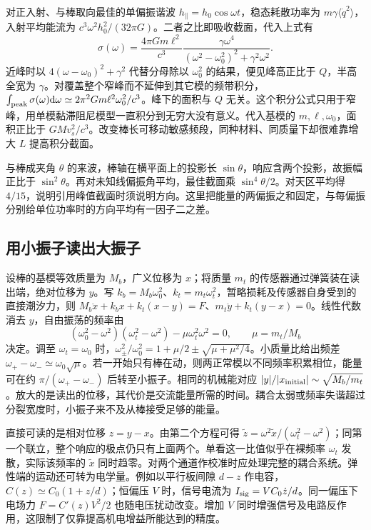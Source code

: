 对正入射、与棒取向最佳的单偏振谐波 $h_\parallel=h_0\cos\omega t$，稳态耗散功率为 $m\gamma\langle\dot q^2\rangle$，入射平均能流为 $c^3\omega^2 h_0^2/(32\pi G)$。二者之比即吸收截面，代入上式有
\[
 \sigma(\omega)=\frac{4\pi Gm\ell^2}{c^3}
 \frac{\gamma\omega^4}{(\omega^2-\omega_0^2)^2+\gamma^2\omega^2}.
\]
近峰时以 $4(\omega-\omega_0)^2+\gamma^2$ 代替分母除以 $\omega_0^2$ 的结果，便见峰高正比于 $Q$，半高全宽为 $\gamma$。对覆盖整个窄峰而不延伸到其它模的频带积分，$\int_{\rm peak}\sigma(\omega)\dd\omega\simeq2\pi^2Gm\ell^2\omega_0^2/c^3$。峰下的面积与 $Q$ 无关。这个积分公式只用于窄峰，用单模黏滞阻尼模型一直积分到无穷大没有意义。代入基模的 $m,\ell,\omega_0$，面积正比于 $GMv_s^2/c^3$。改变棒长可移动敏感频段，同种材料、同质量下却很难靠增大 $L$ 提高积分截面。

与棒成夹角 $\theta$ 的来波，棒轴在横平面上的投影长 $\sin\theta$，响应含两个投影，故振幅正比于 $\sin^2\theta$。再对未知线偏振角平均，最佳截面乘 $\sin^4\theta/2$。对天区平均得 $4/15$，说明引用峰值截面时须说明方向。这里把能量的两偏振之和固定，与每偏振分别给单位功率时的方向平均有一因子二之差。

\subsection{用小振子读出大振子}
设棒的基模等效质量为 $M_b$，广义位移为 $x$；将质量 $m_t$ 的传感器通过弹簧装在读出端，绝对位移为 $y$。写 $k_b=M_b\omega_0^2$、$k_t=m_t\omega_t^2$，暂略损耗及传感器自身受到的直接潮汐力，则 $M_b\ddot x+k_b x+k_t(x-y)=F$、$m_t\ddot y+k_t(y-x)=0$。线性代数消去 $y$，自由振荡的频率由
\[
 (\omega_0^2-\omega^2)(\omega_t^2-\omega^2)
       -\mu\omega_t^2\omega^2=0,\qquad \mu=m_t/M_b
\]
决定。调至 $\omega_t=\omega_0$ 时，$\omega_\pm^2/\omega_0^2=1+\mu/2\pm\sqrt{\mu+\mu^2/4}$。小质量比给出频差 $\omega_+-\omega_-\simeq\omega_0\sqrt\mu$。若一开始只有棒在动，则两正常模以不同频率积累相位，能量可在约 $\pi/(\omega_+-\omega_-)$ 后转至小振子。相同的机械能对应 $|y|/|x_{\rm initial}|\sim\sqrt{M_b/m_t}$。放大的是读出的位移，其代价是交流能量所需的时间。耦合太弱或频率失谐超过分裂宽度时，小振子来不及从棒接受足够的能量。

直接可读的是相对位移 $z=y-x$。由第二个方程可得 $\tilde z=\omega^2\tilde x/(\omega_t^2-\omega^2)$；同第一个联立，整个响应的极点仍只有上面两个。单看这一比值似乎在裸频率 $\omega_t$ 发散，实际该频率的 $\tilde x$ 同时趋零。对两个通道作校准时应处理完整的耦合系统。弹性端的运动还可转为电学量。例如以平行板间隙 $d-z$ 作电容，$C(z)\simeq C_0(1+z/d)$；恒偏压 $V$ 时，信号电流为 $I_{\rm sig}=VC_0\dot z/d$。同一偏压下电场力 $F=C'(z)V^2/2$ 也随电压扰动改变。增加 $V$ 同时增强信号及电路反作用，这限制了仅靠提高机电增益所能达到的精度。

